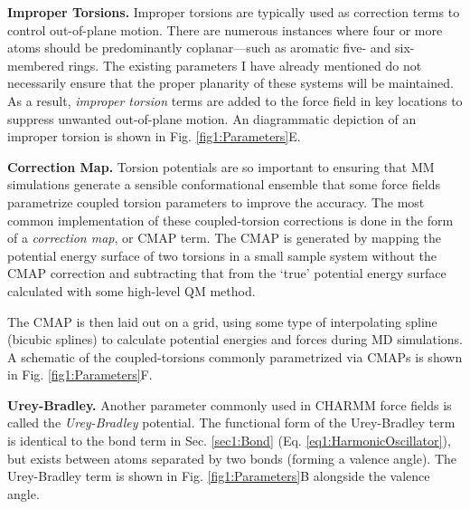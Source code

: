 \textbf{Improper Torsions.} Improper torsions are typically used as correction
terms to control out-of-plane motion. There are numerous instances where four or
more atoms should be predominantly coplanar---such as aromatic five- and
six-membered rings. The existing parameters I have already mentioned do not
necessarily ensure that the proper planarity of these systems will be
maintained. As a result, \emph{improper torsion} terms are added to the force
field in key locations to suppress unwanted out-of-plane motion. An diagrammatic
depiction of an improper torsion is shown in Fig. \ref{fig1:Parameters}E.

\textbf{Correction Map.} Torsion potentials are so important to ensuring that MM
simulations generate a sensible conformational ensemble that some force fields
parametrize coupled torsion parameters to improve the accuracy. The most common
implementation of these coupled-torsion corrections is done in the form of a
\emph{correction map}, or CMAP term. \cite{MacKerell_JComputChem_2004_v25_p1400}
The CMAP is generated by mapping the potential energy surface of two torsions in
a small sample system without the CMAP correction and subtracting that from the
`true' potential energy surface calculated with some high-level QM method.

The CMAP is then laid out on a grid, using some type of interpolating spline
(\eg bicubic splines) to calculate potential energies and forces during MD
simulations. A schematic of the coupled-torsions commonly parametrized via CMAPs
is shown in Fig. \ref{fig1:Parameters}F.

\textbf{Urey-Bradley.} Another parameter commonly used in CHARMM force fields
\cite{MacKerell_JPhysChemB_1998_v102_p3586} is called the \emph{Urey-Bradley}
potential. The functional form of the Urey-Bradley term is identical to the bond
term in Sec. \ref{sec1:Bond} (Eq. \ref{eq1:HarmonicOscillator}), but exists
between atoms separated by two bonds (\ie forming a valence angle). The
Urey-Bradley term is shown in Fig. \ref{fig1:Parameters}B alongside the valence
angle.

